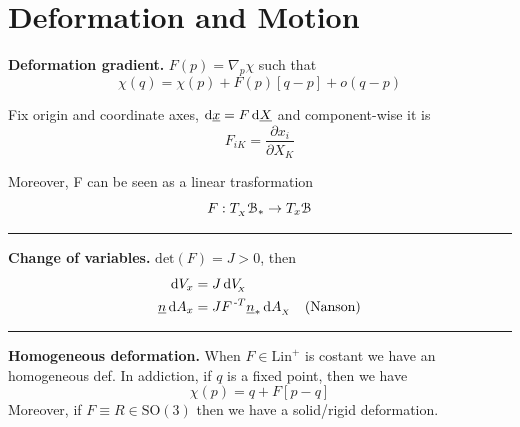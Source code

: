 

\section{\texorpdfstring{\color{red}Deformation and Motion}{}}


\begin{Figure}
\end{Figure}

\textbf{Deformation gradient.} $F(p)=\nabla_{\!p}\chi$ such that
\begin{equation*}
\chi(q)=\chi(p)+F(p)[q-p]+o(q-p)
\end{equation*}

Fix origin and coordinate axes, $\mathrm{d} \underline{x}=F\,\mathrm{d}\underline{X}$ and component-wise it is
\begin{equation*}
F_{iK}=\frac{\partial x_i}{\partial X_K} 
\end{equation*}

Moreover, F can be seen as a linear trasformation
\begin{equation*}
F:T_{_X} \EuScript{B}_*\to T_x \EuScript{B}
\end{equation*}

\rule{0.31\textwidth}{0.2pt}
\smallskip

\textbf{Change of variables.} $\text{det}(F)=J>0$, then
\begin{align*}
\mathrm{d} V_x &= J\,\mathrm{d} V_{\!_X} \\
\underline{n}\,\mathrm{d} A_x &= JF^{\,\text{-}T}\underline{n}_*\,\mathrm{d} A_{_X}\quad(\text{Nanson})
\end{align*}

\rule{0.31\textwidth}{0.2pt}
\smallskip

\textbf{Homogeneous deformation.} When $F\in\text{Lin}^+$ is costant we have an homogeneous def. In addiction, if $q$ is a fixed point, then we have
\begin{equation*}
\chi(p)=q+F[p-q]
\end{equation*}
Moreover, if $F\equiv R\in \text{SO}(3)$ then we have a solid/rigid deformation.

